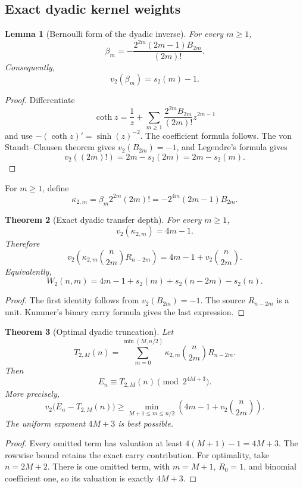 \documentclass[11pt]{article}
\newtheorem{theorem}{Theorem}[section]\newtheorem{proposition}[theorem]{Proposition}\newtheorem{lemma}[theorem]{Lemma}\newtheorem{corollary}[theorem]{Corollary}
\theoremstyle{definition}\newtheorem{definition}[theorem]{Definition}\newtheorem{example}[theorem]{Example}\newtheorem{construction}[theorem]{Construction}\newtheorem{algorithm}[theorem]{Algorithm}\newtheorem{conjecture}[theorem]{Conjecture}\newtheorem{problem}[theorem]{Problem}
\theoremstyle{remark}\newtheorem{remark}[theorem]{Remark}\newtheorem{boundary}[theorem]{Boundary}\newtheorem{certificate}[theorem]{Computational Certificate}\newtheorem{classical}[theorem]{Classical Input}\newtheorem{principle}[theorem]{Structural Principle}
\begin{document}
\subsection{Exact dyadic kernel weights}
\begin{lemma}[Bernoulli form of the dyadic inverse]
For every $m\geq1$,
\[
 \boxed{\beta_m=-\frac{2^{2m}(2m-1)B_{2m}}{(2m)!}.}
\]
Consequently,
\[
 \boxed{v_2(\beta_m)=s_2(m)-1.}
\]
\end{lemma}

\begin{proof}
Differentiate
\[
 \coth z=\frac1z+\sum_{m\geq1}\frac{2^{2m}B_{2m}}{(2m)!}z^{2m-1}
\]
and use $-(\coth z)'=\sinh(z)^{-2}$. The coefficient formula follows. The von Staudt--Clausen theorem gives $v_2(B_{2m})=-1$, and Legendre's formula gives
\[
 v_2((2m)!)=2m-s_2(2m)=2m-s_2(m).
\]
\end{proof}

For $m\geq1$, define
\[
 \boxed{\kappa_{2,m}=\beta_m2^{2m}(2m)!=-2^{4m}(2m-1)B_{2m}.}
\]

\begin{theorem}[Exact dyadic transfer depth]
For every $m\geq1$,
\[
 \boxed{v_2(\kappa_{2,m})=4m-1.}
\]
Therefore
\[
 \boxed{v_2\left(\kappa_{2,m}\binom n{2m}R_{n-2m}\right)=4m-1+v_2\binom n{2m}.}
\]
Equivalently,
\[
 \boxed{W_2(n,m)=4m-1+s_2(m)+s_2(n-2m)-s_2(n).}
\]
\end{theorem}

\begin{proof}
The first identity follows from $v_2(B_{2m})=-1$. The source $R_{n-2m}$ is a unit. Kummer's binary carry formula gives the last expression.
\end{proof}

\begin{theorem}[Optimal dyadic truncation]
Let
\[
 T_{2,M}(n)=\sum_{m=0}^{\min(M,n/2)}\kappa_{2,m}\binom n{2m}R_{n-2m}.
\]
Then
\[
 \boxed{E_n\equiv T_{2,M}(n)\pmod{2^{4M+3}}.}
\]
More precisely,
\[
 \boxed{v_2\bigl(E_n-T_{2,M}(n)\bigr)\geq\min_{M+1\leq m\leq n/2}\left(4m-1+v_2\binom n{2m}\right).}
\]
The uniform exponent $4M+3$ is best possible.
\end{theorem}

\begin{proof}
Every omitted term has valuation at least $4(M+1)-1=4M+3$. The rowwise bound retains the exact carry contribution. For optimality, take $n=2M+2$. There is one omitted term, with $m=M+1$, $R_0=1$, and binomial coefficient one, so its valuation is exactly $4M+3$.
\end{proof}
\end{document}
